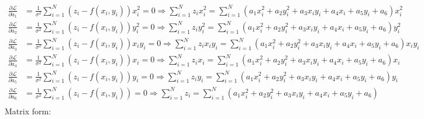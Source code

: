 \documentclass[11pt, fleqn]{article}
\begin{document}
\begin{equation*}
    \begin{split}
        \frac{\partial \mathcal{L}}{\partial a_1} &= \frac{1}{{\sigma^2}}\sum_{i=1}^{N} (z_i - f(x_i,y_i)) x_i^2 = 0 \Longrightarrow \sum_{i=1}^{N} z_i x_i^2 = \sum_{i=1}^{N} (a_1 x_i^2 + a_2 y_i^2 + a_3 x_iy_i + a_4 x_i + a_5 y_i + a_6) x_i^2\\
        \frac{\partial \mathcal{L}}{\partial a_2} &= \frac{1}{{\sigma^2}}\sum_{i=1}^{N} (z_i - f(x_i,y_i)) y_i^2 = 0 \Longrightarrow \sum_{i=1}^{N} z_i y_i^2= \sum_{i=1}^{N} (a_1 x_i^2 + a_2 y_i^2 + a_3 x_iy_i + a_4 x_i + a_5 y_i + a_6) y_i^2\\
        \frac{\partial \mathcal{L}}{\partial a_3} &= \frac{1}{{\sigma^2}}\sum_{i=1}^{N} (z_i - f(x_i,y_i)) x_iy_i = 0 \Longrightarrow \sum_{i=1}^{N} z_i x_iy_i= \sum_{i=1}^{N} (a_1 x_i^2 + a_2 y_i^2 + a_3 x_iy_i + a_4 x_i + a_5 y_i + a_6) x_iy_i\\
        \frac{\partial \mathcal{L}}{\partial a_4} &= \frac{1}{{\sigma^2}}\sum_{i=1}^{N} (z_i - f(x_i,y_i)) x_i = 0 \Longrightarrow \sum_{i=1}^{N} z_i x_i= \sum_{i=1}^{N} (a_1 x_i^2 + a_2 y_i^2 + a_3 x_iy_i + a_4 x_i + a_5 y_i + a_6) x_i\\
        \frac{\partial \mathcal{L}}{\partial a_5} &= \frac{1}{{\sigma^2}}\sum_{i=1}^{N} (z_i - f(x_i,y_i)) y_i = 0 \Longrightarrow \sum_{i=1}^{N} z_i y_i= \sum_{i=1}^{N} (a_1 x_i^2 + a_2 y_i^2 + a_3 x_iy_i + a_4 x_i + a_5 y_i + a_6) y_i\\
        \frac{\partial \mathcal{L}}{\partial a_6} &= \frac{1}{{\sigma^2}}\sum_{i=1}^{N} (z_i - f(x_i,y_i)) = 0 \Longrightarrow \sum_{i=1}^{N} z_i = \sum_{i=1}^{N} (a_1 x_i^2 + a_2 y_i^2 + a_3 x_iy_i + a_4 x_i + a_5 y_i + a_6)\\
    \end{split}
\end{equation*}
Matrix form:
\end{document}
